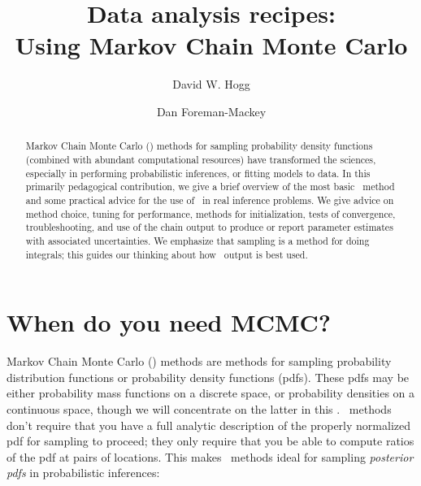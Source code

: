 \documentclass[modern]{aastex61}
\newcommand{\MCMC}{\acronym{MCMC}}
\begin{document}
\sloppy\sloppypar\raggedbottom\frenchspacing\thispagestyle{plain}%
%
\title{Data analysis recipes:\\
       Using Markov Chain Monte Carlo%
}%

\author[0000-0003-2866-9403]{David W. Hogg}

\author[0000-0002-9328-5652]{Dan Foreman-Mackey}

\begin{abstract}
Markov Chain Monte Carlo (\MCMC) methods for sampling probability
density functions (combined with abundant computational resources)
have transformed the sciences, especially in performing probabilistic
inferences, or fitting models to data.
In this primarily pedagogical contribution,
we give a brief overview of the most basic \MCMC\ method and some
practical advice for the use of \MCMC\ in real inference problems.
We give advice on method choice, tuning for performance,
methods for initialization, tests of convergence, troubleshooting, and use of the chain
output to produce or report parameter estimates with associated uncertainties.
We emphasize that sampling is a method for doing integrals; this guides our thinking
about how \MCMC\ output is best used.
\end{abstract}

\section{When do you need MCMC?}\label{sec:when}

Markov Chain Monte Carlo (\MCMC) methods are methods for sampling
probability distribution functions or probability density functions (pdfs).
These pdfs may be either probability mass functions on a discrete
space, or probability densities on a continuous space, though we will
concentrate on the latter in this \documentname.
\MCMC\ methods don't require that you have a full analytic description of the
properly normalized pdf for sampling to proceed; they only require
that you be able to compute ratios of the pdf at pairs of locations.
This makes \MCMC\ methods ideal for sampling \emph{posterior
  pdfs} in probabilistic inferences:
\end{document}
